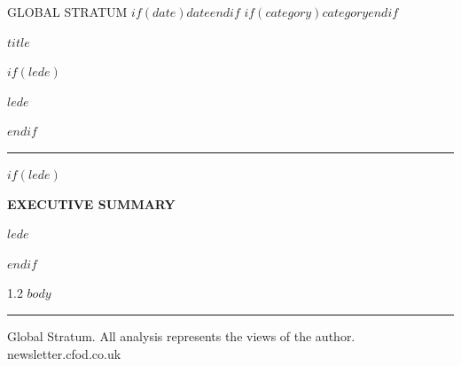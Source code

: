 \documentclass[12pt,a4paper]{article}
\begin{document}
\thispagestyle{firstpage}

\noindent
{\fontsize{7.5}{10}\selectfont\sffamily\color{gsMuted}%
\MakeUppercase{Global Stratum}%
$if(date)$\enspace\textperiodcentered\enspace\MakeUppercase{$date$}$endif$%
$if(category)$\enspace\textperiodcentered\enspace\MakeUppercase{$category$}$endif$}

\vspace{1.1em}

{\fontsize{34}{38}\selectfont\bfseries\sffamily\color{gsDark}%
\MakeUppercase{$title$}\par}

\vspace{0.6em}

$if(lede)$
{\fontsize{13}{17}\selectfont\itshape\color{black!75} $lede$\par}
$endif$

\vspace{0.75em}
\noindent\rule{\linewidth}{0.5pt}
\vspace{1.25em}

$if(lede)$
\begin{summarybox}
{\fontsize{8.5}{11}\selectfont\sffamily\bfseries\MakeUppercase{Executive Summary}}

\vspace{0.4em}
{\fontsize{10.5}{15}\selectfont\itshape $lede$\par}
\end{summarybox}
$endif$

\begin{spacing}{1.2}
$body$
\end{spacing}

\vspace{2em}
\noindent\rule{\linewidth}{0.4pt}
\vspace{0.3em}

{\fontsize{7}{9}\selectfont\sffamily\color{gsMuted}%
\textcopyright\enspace Global Stratum.\enspace
All analysis represents the views of the author.\enspace
newsletter.cfod.co.uk}
\end{document}
